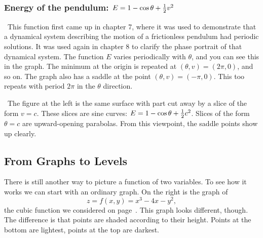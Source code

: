 {{{{\subsubsection{Energy of the pendulum: $E = 1 - \cos{\theta} + {1 \over 2} v^2$}

\vspace{200pt}

\hfill
\quad \ This function first came up in chapter 7, where it was used to demonstrate that a dynamical system describing the motion of a frictionless pendulum had periodic solutions.  It was used again in chapter 8 to clarify the phase portrait of that dynamical system.  The function $E$ varies periodically with $\theta$, and you can see this in the graph.  The minimum at the origin is repeated at $(\theta, v) = (2\pi, 0)$, and so on.  The graph also has a saddle at the point $(\theta, v) = (-\pi, 0)$.  This too repeats with period $2\pi$ in the $\theta$ direction.

\quad \ The figure at the left is the same surface with part cut away by a slice of the form $v = c$.  These slices are sine curves: $E = 1 - \cos{\theta} + {1 \over 2} c^2$.  Slices of the form $\theta = c$ are upward-opening parabolas.  From this viewpoint, the saddle points show up clearly.

	

\subsection{From Graphs to Levels}


There is still another way to picture a function of two variables.  To see how it works we can start with an ordinary graph.  On the right is the graph of 
	\[
z = f(x, y) = x^3 - 4x - y^2,
\]
the cubic function we considered on page~\pageref{cubic}.  This graph looks different, though.  The difference is that points are shaded according to their height.  Points at the bottom are lightest, points at the top are darkest.  

}}}}
